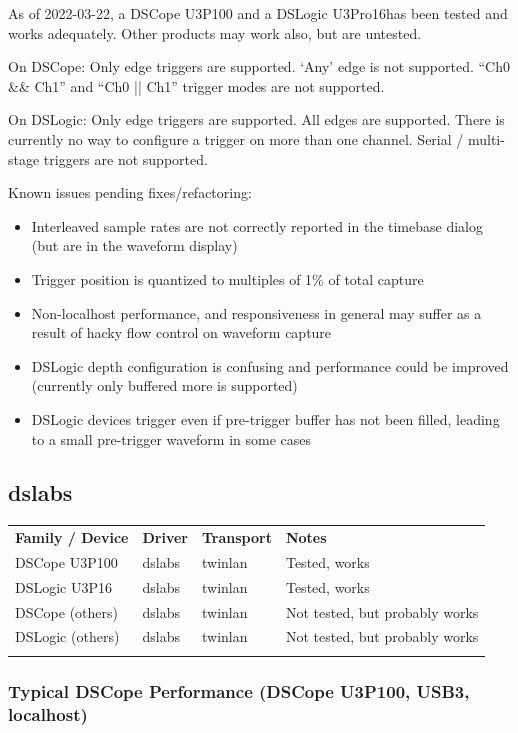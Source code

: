 As of 2022-03-22, a DSCope U3P100 and a DSLogic U3Pro16has been tested and works adequately. Other products may work
also, but are untested.

On DSCope: Only edge triggers are supported. `Any' edge is not supported. ``Ch0 \&\& Ch1'' and ``Ch0 || Ch1'' trigger modes
are not supported.

On DSLogic: Only edge triggers are supported. All edges are supported. There is currently no way to configure a trigger on more
than one channel. Serial / multi-stage triggers are not supported.

Known issues pending fixes/refactoring:
\begin{itemize}
	\item Interleaved sample rates are not correctly reported in the timebase dialog (but are in the waveform display)
	\item Trigger position is quantized to multiples of 1\% of total capture
	\item Non-localhost performance, and responsiveness in general may suffer as a result of hacky flow control on waveform capture
	\item DSLogic depth configuration is confusing and performance could be improved (currently only buffered more is supported)
	\item DSLogic devices trigger even if pre-trigger buffer has not been filled, leading to a small pre-trigger waveform in some cases
\end{itemize}

\subsection{dslabs}

\begin{tabularx}{16cm}{lllX}
\thickhline
\textbf{Family / Device} & \textbf{Driver} & \textbf{Transport} & \textbf{Notes} \\
\thickhline
DSCope U3P100 & dslabs & twinlan & Tested, works\\
\thinhline
DSLogic U3P16 & dslabs & twinlan & Tested, works\\
\thinhline
DSCope (others) & dslabs & twinlan & Not tested, but probably works\\
\thinhline
DSLogic (others) & dslabs & twinlan & Not tested, but probably works\\
\thickhline
\end{tabularx}

\subsubsection{Typical DSCope Performance (DSCope U3P100, USB3, localhost)}

